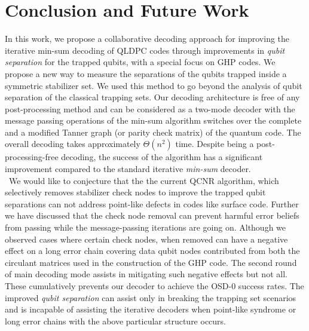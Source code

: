 \documentclass[%
 reprint,
 amsmath,amssymb,
 aps,
pra,
showkeys,
]{revtex4-2}
\begin{document}
\section{Conclusion and Future Work}
In this work, we propose a collaborative decoding approach for improving the iterative min-sum decoding of QLDPC codes through improvements in \textit{qubit separation} for the trapped qubits, with a special focus on GHP codes.
We propose a new way to measure the separations of the qubits trapped inside a symmetric stabilizer set.
We used this method to go beyond the analysis of qubit separation of the classical trapping sets.
Our decoding architecture is free of any post-processing method and can be considered as a two-mode decoder with the message passing operations of the min-sum algorithm switches over the complete and a modified Tanner graph (or parity check matrix) of the quantum code.
The overall decoding takes approximately $\Theta(n^2)$ time.
Despite being a post-processing-free decoding, the success of the algorithm has a significant improvement compared to the standard iterative \textit{min-sum} decoder.\\\
We would like to conjecture that the the current QCNR algorithm, which selectively removes stabilizer check nodes to improve the trapped qubit separations can not address point-like defects in codes like surface code.
Further we have discussed that the check node removal can prevent harmful error beliefs from passing while the message-passing iterations are going on.
Although we observed cases where certain check nodes, when removed can have a negative effect on a long error chain covering data qubit nodes contributed from both the circulant matrices used in the construction of the GHP code.
The second round of main decoding mode assists in mitigating such negative effects but not all.
These cumulatively prevents our decoder to achieve the OSD-$0$ success rates.
The improved \textit{qubit separation} can assist only in breaking the trapping set scenarios and is incapable of assisting the iterative decoders when point-like syndrome or long error chains with the above particular structure occurs.
\end{document}
